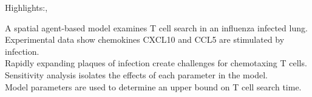 \documentclass{article}
\begin{document}
\noindent Highlights:, \\

\vspace{0.25in}

\noindent A spatial agent-based model examines T cell search in an influenza infected lung. \\

\noindent Experimental data show chemokines CXCL10 and CCL5 are stimulated by infection. \\

\noindent Rapidly expanding plaques of infection create challenges for chemotaxing T cells. \\

\noindent Sensitivity analysis isolates the effects of each parameter in the model. \\

\noindent Model parameters are used to determine an upper bound on T cell search time. \\
\end{document}
